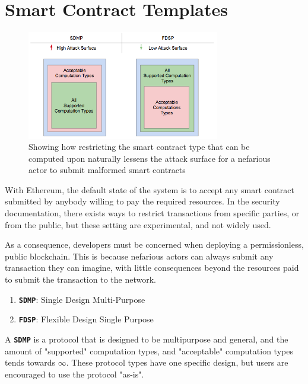 \documentclass[12pt, titlepage, twocolumn]{report}
\begin{document}
\section{Smart Contract Templates}

 \begin{figure}[ht]
\centering
	\includegraphics[width=0.75\textwidth]{contract_security}
	\caption{Showing how restricting the smart contract type that can be computed upon naturally lessens the attack surface for a nefarious actor to submit malformed smart contracts}
	\label{contract_security}
\end{figure}


With Ethereum, the default state of the system is to accept any smart contract submitted by anybody willing to pay the required resources. In the security documentation, there exists ways to restrict transactions from specific parties, or from the public, but these setting are experimental, and not widely used. 

As a consequence, developers must be concerned when deploying a permissionless, public blockchain. This is because nefarious actors can always submit any transaction they can imagine, with little consequences beyond the resources paid to submit the transaction to the network.

\begin{enumerate}
	\item \texttt{\textbf{SDMP}}: Single Design Multi-Purpose 
	\item \texttt{\textbf{FDSP}}: Flexible Design Single Purpose
\end{enumerate}

A \texttt{\textbf{SDMP}} is a protocol that is designed to be multipurpose and general, and the amount of "supported" computation types, and "acceptable" computation types tends towards \(\infty\). These protocol types have one specific design, but users are encouraged to use the protocol "as-is". 
\end{document}
